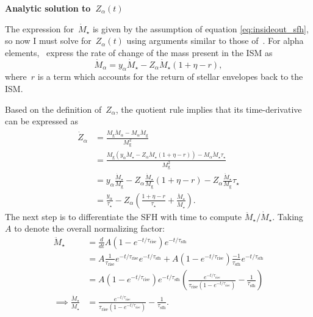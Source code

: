 \documentclass[12pt]{article}
\newcommand{\timescale}[1]{\ensuremath{\tau_\text{#1}}}
\begin{document}
\par\null\par\noindent
\textbf{Analytic solution to~$Z_\alpha(t)$}
\par\noindent
The expression for~$\dot{M}_\star$ is given by the assumption of equation
\ref{eq:insideout_sfh}, so now I must solve for~$Z_\alpha(t)$ using arguments
similar to those of~\citet*{Weinberg2017}.
For alpha elements,~\citet*{Weinberg2017} express the rate of change of the
mass present in the ISM as
\begin{equation}
\dot{M}_\alpha = y_\alpha \dot{M}_\star - Z_\alpha \dot{M}_\star (1 + \eta - r),
\label{eq:mdot_alpha}
\end{equation}
where~$r$ is a term which accounts for the return of stellar envelopes back to
the ISM.
\par
Based on the definition of~$Z_\alpha$, the quotient rule implies that its
time-derivative can be expressed as
\begin{subequations}\begin{align}
\dot{Z}_\alpha &= \frac{
	M_\text{g} \dot{M}_\alpha - M_\alpha \dot{M}_\text{g}
}{
	M_\text{g}^2
}
\\
&= \frac{
	M_\text{g} (y_\alpha \dot{M}_\star - Z_\alpha \dot{M}_\star (1 + \eta - r))
	- M_\alpha \ddot{M}_\star \tau_\star
}{
	M_\text{g}^2
}
\\
&= y_\alpha \frac{\dot{M}_\star}{M_\text{g}} -
Z_\alpha \frac{\dot{M}_\star}{M_\text{g}}(1 + \eta - r) -
Z_\alpha \frac{\ddot{M}_\star}{M_\text{g}} \tau_\star
\\
&= \frac{y_\alpha}{\tau_\star} -
Z_\alpha \left(\frac{1 + \eta - r}{\tau_\star} +
\frac{\ddot{M}_\star}{\dot{M}_\star}\right).
\label{eq:dzdt}
\end{align}\end{subequations}
The next step is to differentiate the SFH with time to compute
$\ddot{M}_\star / \dot{M}_\star$. Taking~$A$ to denote the overall normalizing
factor:
\begin{subequations}\begin{align}
\ddot{M}_\star &= \frac{d}{dt}
A(1 - e^{-t / \timescale{rise}}) e^{-t / \timescale{sfh}}
\\
&= A \frac{1}{\timescale{rise}}e^{-t / \timescale{rise}}
e^{-t / \timescale{sfh}} +
A(1 - e^{-t / \timescale{rise}}) \frac{-1}{\timescale{sfh}}
e^{-t / \timescale{sfh}}
\\
&= A(1 - e^{-t / \timescale{rise}})e^{-t / \timescale{sfh}}
\left(\frac{
	e^{-t / \timescale{rise}}
}{
	\timescale{rise}(1 - e^{-t / \timescale{rise}})
} - \frac{1}{\timescale{sfh}}
\right)
\\
\implies \frac{\ddot{M}_\star}{\dot{M}_\star} &= \frac{
	e^{-t / \timescale{rise}}
}{
	\timescale{rise}(1 - e^{-t / \timescale{rise}})
} - \frac{1}{\timescale{sfh}}.
\label{eq:mddotstar-over-mdotstar}
\end{align}\end{subequations}
\end{document}
